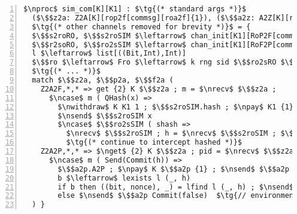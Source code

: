 \centering
\begin{lstlisting}[basicstyle=\scriptsize\BeraMonottFamily, mathescape, frame=single, numbers=left, xleftmargin=2em, xrightmargin=0em]
$\nproc$ sim_com[K][K1] : $\tg{(* standard args *)}$ 
  ($\$$z2a: Z2A[K][rop2f[commsg][roa2f]{1}), ($\$$a2z: A2Z[K][ro2fp[commsg][rof2a]{0}),
  $\tg{(* other channels removed for brevity *)}$ = {
  $\$$s2roRO, $\$$s2roSIM $\leftarrow$ chan_init[K1][RoP2F[commsg]][rop2f[commsg]]
  $\$$r2soRO, $\$$ro2sSIM $\leftarrow$ chan_init[K1][RoF2P[commsg]][rof2p[commsg]]
  l $\leftarrow$ list[((Bit,Int),Int)]
  $\$$ro $\leftarrow$ Fro $\leftarrow$ k rng sid $\$$ro2sRO $\$$s2roRO l
  $\tg{(* ... *)}$
  match $\$$z2a, $\$$p2a, $\$$f2a (
    Z2A2F,*,* => get {2} K $\$$z2a ; m = $\nrecv$ $\$$z2a ;
      $\ncase$ m ( QHash(x) =>
        $\nwithdraw$ K K1 1 ; $\$$s2roSIM.hash ; $\npay$ K1 {1} $\$$s2roSIM ; $\nsend$ $\$$s2roSIM pidS 
        $\nsend$ $\$$s2roSIM x 
        $\ncase$ $\$$ro2sSIM ( shash =>
          $\nrecv$ $\$$s2roSIM ; h = $\nrecv$ $\$$s2roSIM ; $\$$a2z.F2A2Z ; $\nsend$ $\$$a2z RHash(h)
          $\tg{(* continue to intercept hashed *)}$
    Z2A2P,*,* => $\nget$ {2} K $\$$z2a ; pid = $\nrecv$ $\$$z2a ; m = $\nrecv$ $\$$z3a 
      $\ncase$ m ( Send(Commit(h)) =>
        $\$$a2p.A2P ; $\npay$ K $\$$a2p {1} ; $\nsend$ $\$$a2p pidS 
        b $\leftarrow$ lexists l (_, h)
        if b then ((bit, nonce), _) = lfind l (_, h) ; $\nsend$ $\$$a2p Commit(bit)  $\tg{// commitment has preimage}$
        else $\nsend$ $\$$a2p Commit(false)  $\tg{// environment commiting to something that will fail}$
  ) }
\end{lstlisting}
\caption{The simulator for the corrupt sender, intercepting and replaying hash queries in its sandboxed \Fro.}
\label{fig:simcom}
